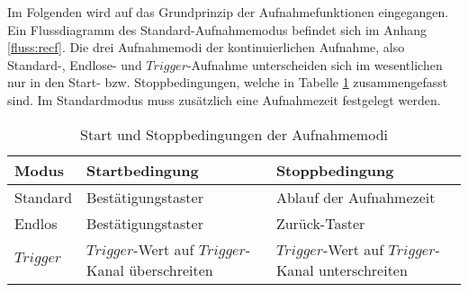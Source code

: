 Im Folgenden wird auf das Grundprinzip der Aufnahmefunktionen eingegangen. Ein Flussdiagramm des Standard-Aufnahmemodus befindet sich im Anhang \ref{fluss:recf}.\newline
Die drei Aufnahmemodi der kontinuierlichen Aufnahme, also Standard-, Endlose- und $Trigger$-Aufnahme unterscheiden sich im wesentlichen nur in den Start- bzw. Stoppbedingungen, welche in Tabelle \ref{tab:recstartstop} zusammengefasst sind. Im Standardmodus muss zusätzlich eine Aufnahmezeit festgelegt werden. 
\begin{table}[h]
	\begin{center}
		\caption{Start und Stoppbedingungen der Aufnahmemodi}
		\label{tab:recstartstop}
		\begin{tabular}{l | p{6cm} | p{6cm}}
			Modus & Startbedingung & Stoppbedingung\\
			\hline
			Standard & Bestätigungstaster & Ablauf der Aufnahmezeit\\
			Endlos & Bestätigungstaster & Zurück-Taster\\
			$Trigger$ & $Trigger$-Wert auf $Trigger$-Kanal überschreiten & $Trigger$-Wert auf $Trigger$-Kanal unterschreiten
		\end{tabular}
	\end{center}
\end{table}\newline
